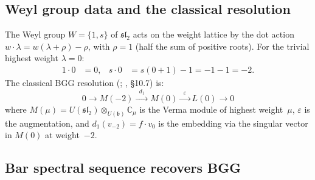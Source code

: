 \subsection{Weyl group data and the classical resolution}

\begin{computation}[BGG data for \texorpdfstring{$\mathfrak{sl}_2$}{sl_2}, \texorpdfstring{$\lambda = 0$}{lambda = 0}]
\label{comp:bgg-sl2-data}

The Weyl group $W = \{1, s\}$ of $\mathfrak{sl}_2$ acts on
the weight lattice by the dot action
$w \cdot \lambda = w(\lambda + \rho) - \rho$,
with $\rho = 1$ (half the sum of positive roots).
For the trivial highest weight $\lambda = 0$:
\begin{align*}
1 \cdot 0 &= 0, &
s \cdot 0 &= s(0 + 1) - 1 = -1 - 1 = -2.
\end{align*}
The classical BGG resolution
(\cite{BGG76}; \cite{Kac}, \S10.7) is:
\begin{equation}\label{eq:bgg-sl2-classical}
0 \longrightarrow M(-2) \xrightarrow{\;\;d_1\;\;}
M(0) \xrightarrow{\;\;\varepsilon\;\;}
L(0) \longrightarrow 0
\end{equation}
where $M(\mu) = U(\mathfrak{sl}_2) \otimes_{U(\mathfrak{b})}
\mathbb{C}_\mu$ is the Verma module of highest weight~$\mu$,
$\varepsilon$ is the augmentation, and
$d_1(v_{-2}) = f \cdot v_0$ is the embedding via the singular
vector in $M(0)$ at weight~$-2$.
\end{computation}


\subsection{Bar spectral sequence recovers BGG}


